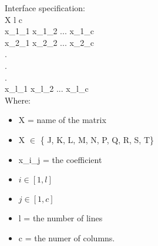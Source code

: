 \addtocounter{framenumber}{-1}
\begin{frame}
	Interface specification: \\
		
	\hspace{10pt}	X l c \\
	\hspace{10pt}	x\_1\_1 x\_1\_2 ... x\_1\_c \\
	\hspace{10pt}	x\_2\_1 x\_2\_2 ... x\_2\_c \\
	\hspace{10pt}	.\\
	\hspace{10pt}	.\\
	\hspace{10pt}	.\\
	\hspace{10pt}	x\_l\_1 x\_l\_2 ... x\_l\_c\\
			

		Where:
		\begin{itemize}
			\item X = name of the matrix
			\item X $\in$ \{ J, K, L, M, N, P, Q, R, S, T\}
			\item x\_i\_j = the coefficient
			\item $i \in [1, l]$
			\item $j \in [1, c]$
			\item l = the number of lines
			\item c = the numer of columns.
		\end{itemize}

\end{frame}

